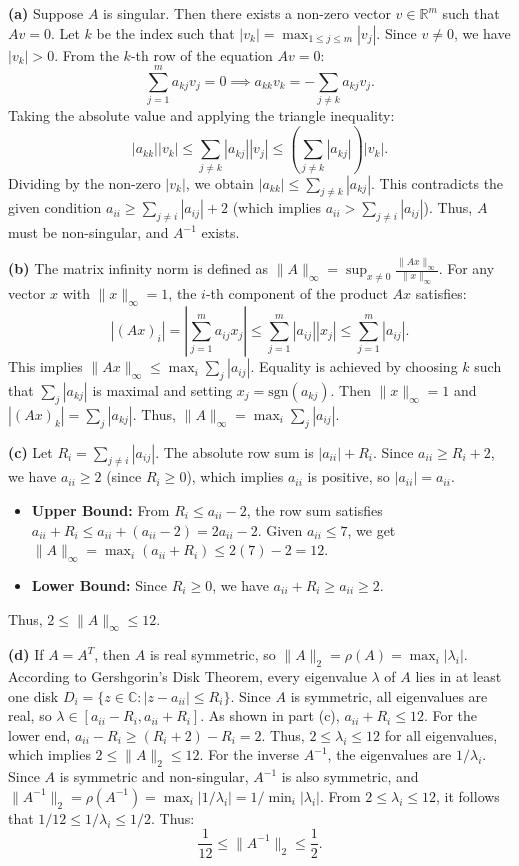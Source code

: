 \begin{solution}
\textbf{(a)} Suppose $A$ is singular. Then there exists a non-zero vector $v \in \mathbb{R}^m$ such that $Av = 0$. Let $k$ be the index such that $|v_k| = \max_{1 \leq j \leq m} |v_j|$. Since $v \neq 0$, we have $|v_k| > 0$. From the $k$-th row of the equation $Av=0$:
\[ \sum_{j=1}^m a_{kj} v_j = 0 \implies a_{kk} v_k = -\sum_{j \neq k} a_{kj} v_j. \]
Taking the absolute value and applying the triangle inequality:
\[ |a_{kk}| |v_k| \leq \sum_{j \neq k} |a_{kj}| |v_j| \leq \left(\sum_{j \neq k} |a_{kj}|\right) |v_k|. \]
Dividing by the non-zero $|v_k|$, we obtain $|a_{kk}| \leq \sum_{j \neq k} |a_{kj}|$. This contradicts the given condition $a_{ii} \geq \sum_{j \neq i} |a_{ij}| + 2$ (which implies $a_{ii} > \sum_{j \neq i} |a_{ij}|$). Thus, $A$ must be non-singular, and $A^{-1}$ exists.

\textbf{(b)} The matrix infinity norm is defined as $\|A\|_\infty = \sup_{x \neq 0} \frac{\|Ax\|_\infty}{\|x\|_\infty}$. For any vector $x$ with $\|x\|_\infty = 1$, the $i$-th component of the product $Ax$ satisfies:
\[ |(Ax)_i| = \left|\sum_{j=1}^m a_{ij} x_j\right| \leq \sum_{j=1}^m |a_{ij}| |x_j| \leq \sum_{j=1}^m |a_{ij}|. \]
This implies $\|Ax\|_\infty \leq \max_i \sum_j |a_{ij}|$. Equality is achieved by choosing $k$ such that $\sum_j |a_{kj}|$ is maximal and setting $x_j = \text{sgn}(a_{kj})$. Then $\|x\|_\infty = 1$ and $|(Ax)_k| = \sum_j |a_{kj}|$. Thus, $\|A\|_\infty = \max_i \sum_j |a_{ij}|$.

\textbf{(c)} Let $R_i = \sum_{j \neq i} |a_{ij}|$. The absolute row sum is $|a_{ii}| + R_i$. Since $a_{ii} \geq R_i + 2$, we have $a_{ii} \geq 2$ (since $R_i \geq 0$), which implies $a_{ii}$ is positive, so $|a_{ii}| = a_{ii}$.
\begin{itemize}
    \item \textbf{Upper Bound:} From $R_i \leq a_{ii} - 2$, the row sum satisfies $a_{ii} + R_i \leq a_{ii} + (a_{ii} - 2) = 2a_{ii} - 2$. Given $a_{ii} \leq 7$, we get $\|A\|_\infty = \max_i (a_{ii} + R_i) \leq 2(7) - 2 = 12$.
    \item \textbf{Lower Bound:} Since $R_i \geq 0$, we have $a_{ii} + R_i \geq a_{ii} \geq 2$.
\end{itemize}
Thus, $2 \leq \|A\|_\infty \leq 12$.

\textbf{(d)} If $A = A^T$, then $A$ is real symmetric, so $\|A\|_2 = \rho(A) = \max_i |\lambda_i|$. According to Gershgorin's Disk Theorem, every eigenvalue $\lambda$ of $A$ lies in at least one disk $D_i = \{ z \in \mathbb{C} : |z - a_{ii}| \leq R_i \}$. Since $A$ is symmetric, all eigenvalues are real, so $\lambda \in [a_{ii} - R_i, a_{ii} + R_i]$.
As shown in part (c), $a_{ii} + R_i \leq 12$. For the lower end, $a_{ii} - R_i \geq (R_i + 2) - R_i = 2$.
Thus, $2 \leq \lambda_i \leq 12$ for all eigenvalues, which implies $2 \leq \|A\|_2 \leq 12$.
For the inverse $A^{-1}$, the eigenvalues are $1/\lambda_i$. Since $A$ is symmetric and non-singular, $A^{-1}$ is also symmetric, and $\|A^{-1}\|_2 = \rho(A^{-1}) = \max_i |1/\lambda_i| = 1/\min_i |\lambda_i|$.
From $2 \leq \lambda_i \leq 12$, it follows that $1/12 \leq 1/\lambda_i \leq 1/2$. Thus:
\[ \frac{1}{12} \leq \|A^{-1}\|_2 \leq \frac{1}{2}. \]


\end{solution}
